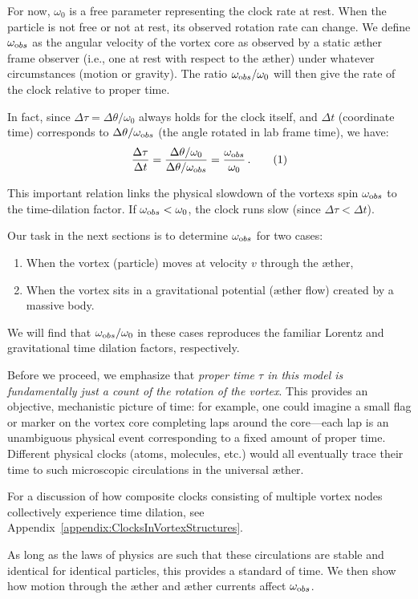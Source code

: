 For now, $\omega_0$ is a free parameter representing the clock rate at rest. When the particle is not free or not at rest, its observed rotation rate can change. We define $\omega_{\textrm obs}$ as the angular velocity of the vortex core as observed by a static æther frame observer (i.e., one at rest with respect to the æther) under whatever circumstances (motion or gravity). The ratio $\omega_{\textrm obs}/\omega_0$ will then give the rate of the clock relative to proper time.

In fact, since $\Delta \tau = \Delta \theta / \omega_0$ always holds for the clock itself, and $\Delta t$ (coordinate time) corresponds to $\Delta \theta / \omega_{\textrm obs}$ (the angle rotated in lab frame time), we have:
\[
\frac{\Delta \tau}{\Delta t} = \frac{\Delta \theta / \omega_0}{\Delta \theta / \omega_{\textrm obs}} = \frac{\omega_{\textrm obs}}{\omega_0} \,. \tag{1}
\]

This important relation links the physical slowdown of the vortex\rqs s spin $\omega_{\textrm obs}$ to the time-dilation factor. If $\omega_{\textrm obs} < \omega_0$, the clock runs slow (since $\Delta \tau < \Delta t$).

Our task in the next sections is to determine $\omega_{\textrm obs}$ for two cases:
\begin{enumerate}
    \item When the vortex (particle) moves at velocity $v$ through the æther,
    \item When the vortex sits in a gravitational potential (æther flow) created by a massive body.
\end{enumerate}
We will find that $\omega_{\textrm obs}/\omega_0$ in these cases reproduces the familiar Lorentz and gravitational time dilation factors, respectively.

Before we proceed, we emphasize that \emph{proper time $\tau$ in this model is fundamentally just a count of the rotation of the vortex}. This provides an objective, mechanistic picture of time: for example, one could imagine a small flag or marker on the vortex core completing laps around the core—each lap is an unambiguous physical event corresponding to a fixed amount of proper time. Different physical clocks (atoms, molecules, etc.) would all eventually trace their time to such microscopic circulations in the universal æther.

For a discussion of how composite clocks consisting of multiple vortex nodes collectively experience time dilation, see Appendix~\ref{appendix:ClocksInVortexStructures}.

As long as the laws of physics are such that these circulations are stable and identical for identical particles, this provides a standard of time. We then show how motion through the æther and æther currents affect $\omega_{\textrm obs}$.